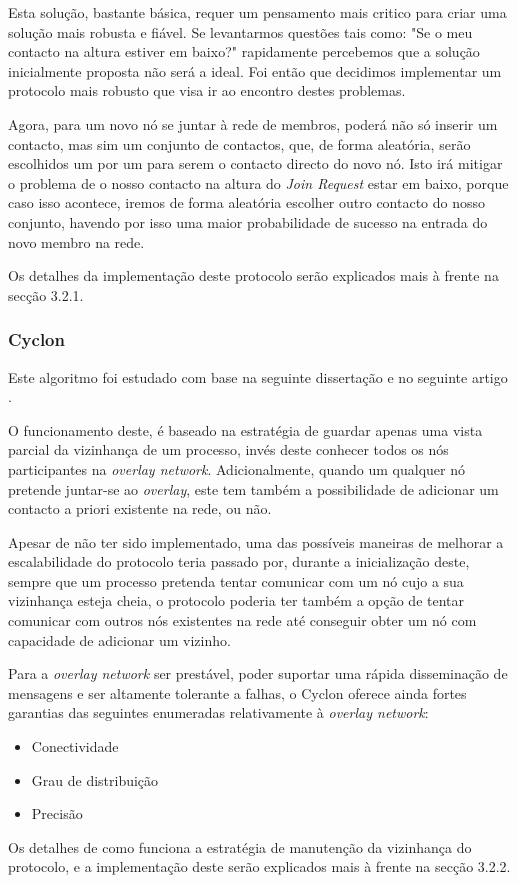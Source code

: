 Esta solução, bastante básica, requer um pensamento mais critico para criar uma solução mais robusta e fiável. Se levantarmos questões tais como: "Se o meu contacto na altura estiver em baixo?" rapidamente percebemos que a solução inicialmente proposta não será a ideal. Foi então que decidimos implementar um protocolo mais robusto que visa ir ao encontro destes problemas.

Agora, para um novo nó se juntar à rede de membros, poderá não só inserir um contacto, mas sim um conjunto de contactos, que, de forma aleatória, serão escolhidos um por um para serem o contacto directo do novo nó. Isto irá mitigar o problema de o nosso contacto na altura do \textit{Join Request} estar em baixo, porque caso isso acontece, iremos de forma aleatória escolher outro contacto do nosso conjunto, havendo por isso uma maior probabilidade de sucesso na entrada do novo membro na rede.

Os detalhes da implementação deste protocolo serão explicados mais à frente na secção 3.2.1.

\subsubsection{Cyclon}
Este algoritmo foi estudado com base na seguinte dissertação \cite{leitao} e no seguinte artigo \cite{cyclon}.

O funcionamento deste, é baseado na estratégia de guardar apenas uma vista parcial da vizinhança de um processo, invés deste conhecer todos os nós participantes na \textit{overlay network}. Adicionalmente, quando um qualquer nó pretende juntar-se ao \textit{overlay}, este tem também a possibilidade de adicionar um contacto a priori existente na rede, ou não.

Apesar de não ter sido implementado, uma das possíveis maneiras de melhorar a escalabilidade do protocolo teria passado por, durante a inicialização deste, sempre que um processo pretenda tentar comunicar com um nó cujo a sua vizinhança esteja cheia, o protocolo poderia ter também a opção de tentar comunicar com outros nós existentes na rede até conseguir obter um nó com capacidade de adicionar um vizinho.

Para a \textit{overlay network} ser prestável, poder suportar uma rápida disseminação de mensagens e ser altamente tolerante a falhas, o Cyclon oferece ainda fortes garantias das seguintes enumeradas relativamente à \textit{overlay network}:
    \begin{itemize}
        \item Conectividade 
        \item Grau de distribuição 
        \item Precisão
    \end{itemize}

Os detalhes de como funciona a estratégia de manutenção da vizinhança do protocolo, e a implementação deste serão explicados mais à frente na secção 3.2.2.